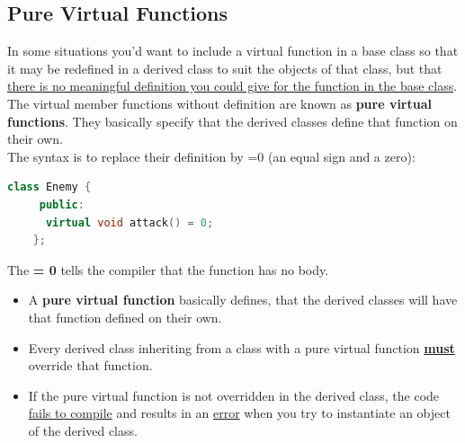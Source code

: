 \documentclass[12pt , a4paper]{article}
\newcommand{\hl}[1]{\colorbox{coolblack}{\color{cream}\textbf{#1}\color{black}}}
\begin{document}
	\subsection{Pure Virtual Functions}
	In some situations you'd want to include a virtual function in a base class so that it may be redefined in a derived class to suit the objects of that class, but that \underline{there is no meaningful definition you could give for the function in the base class}.
	The virtual member functions without definition are known as \textbf{pure virtual functions}. They basically specify that the derived classes define that function on their own.\\
	The syntax is to replace their definition by =0 (an equal sign and a zero):\\
	\begin{lstlisting}[language=C++]
	class Enemy {
	 public:
	  virtual void attack() = 0;
	}; 		
	\end{lstlisting}
The\hl{ = 0} tells the compiler that the function has no body.\\


	\begin{importantBox}

		\begin{itemize}
			\item A \textbf{pure virtual function} basically defines, that the derived classes will have that function defined on their own.\\
			\item Every derived class inheriting from a class with a pure virtual function \textbf{\underline{must}} override that function.\\
			\item If the pure virtual function is not overridden in the derived class, the code \underline{fails to compile} and results in an \underline{error} when you try to instantiate an object of the derived class.\\
		\end{itemize}
	\end{importantBox}
\end{document}
